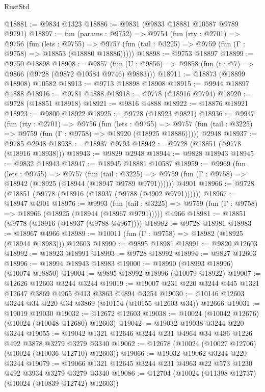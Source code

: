\begin{lexlean}{RustStd}
\begin{coremodule}
@18881 := @9834 @1323
@18886 := @9831 (@9833 @18881 @10587 @9789 @9791)
@18897 := fun (params : @9752) =>
  @9754
    (fun (rty : @2701) =>
    @9756
      (fun (lets : @9755) =>
      @9757 (fun (tail : @3225) => @9759 (fun (Γ : @9758) => @18853 (@18880 @18886)))))
@18898 := @9753 @18897
@18899 := @9750 @18898
@18908 := @9857
    (fun (U : @9856) => @9858 (fun (t : @7) => @9866 (@9728 (@9872 @10584 @9746) @9883)))
@18911 := @18873 (@18899 @18908) @10582
@18913 := @9713 @18898 @18908
@18915 := @9944 @18897 @4888
@18916 := @9781 @4888
@18918 := @9778 (@18916 @9794)
@18920 := @9728 (@18851 @18918)
@18921 := @9816 @4888
@18922 := @18876 @18921
@18923 := @9800 @18922
@18925 := @9728 (@18923 @9821)
@18936 := @9947
    (fun (rty : @2701) =>
    @9756
      (fun (lets : @9755) =>
      @9757 (fun (tail : @3225) => @9759 (fun (Γ : @9758) => @18920 (@18925 @18886)))))
    @2948
@18937 := @9785 @2948
@18938 := @18937 @9793
@18942 := @9728 (@18851 (@9778 (@18916 @18938)))
@18943 := @9829 @2948
@18944 := @9828 @18943
@18945 := @9832 @18943
@18947 := @18945 @18881 @10587
@18959 := @9969
    (fun (lets : @9755) =>
    @9757
      (fun (tail : @3225) =>
      @9759 (fun (Γ : @9758) => @18942 (@18925 (@18944 (@18947 @9789 @9791))))))
    @4901
@18966 := @9728 (@18851 (@9778 (@18916 (@18937 (@9788 (@4902 @9791))))))
@18967 := @18947 @4901
@18976 := @9993
    (fun (tail : @3225) => @9759 (fun (Γ : @9758) => @18966 (@18925 (@18944 (@18967 @9791)))))
    @4966
@18981 := @18851 (@9778 (@18916 (@18937 (@9788 @4967))))
@18982 := @9728 @18981
@18983 := @18967 @4966
@18989 := @10011 (fun (Γ : @9758) => @18982 (@18925 (@18944 @18983))) @12603
@18990 := @9895 @18981
@18991 := @9820 @12603
@18992 := @18923 @18991
@18993 := @9728 @18992
@18994 := @9827 @12603
@18996 := @18994 @18943 @18983
@19000 := @18990 (@18993 @18996) (@10074 @18850)
@19004 := @9895 @18992 @18996 (@10079 @18922)
@19007 := @12626 @12603 @3244 @3244
@19019 := @19007 @231 @220 @3244 @445 @1321 @12647 @3869 @4965 @413 @3863 @4894 @3254
@19030 := @10146 @12603 @3244 @34 @220 @34 @3869 (@10154 (@10155 @12603 @34)) @12666
@19031 := @19019 @19030
@19032 := @12672 @12603
@19038 := @10024 (@10042 @12676) (@10024 (@10048 @12680) @12603)
@19042 := @19032 @19038 @3244 @220 @3244
@19055 := @19042 @1321 @12646 @3244 @231 @4964 @34 @486 @1226 @492 @3878 @3279 @3279 @3340
@19062 := @12678 (@10024 (@10027 @12706) (@10024 (@10036 @12710) @12603))
@19066 := @19032 @19062 @3244 @220 @3244
@19079 := @19066 @1321 @12645 @3244 @231 @4963 @22 @573 @1230 @492 @3934 @3279 @3279 @3340
@19086 := @12704 (@10024 (@11398 @12737) (@10024 (@10839 @12742) @12603))

\end{coremodule}
\end{lexlean}
